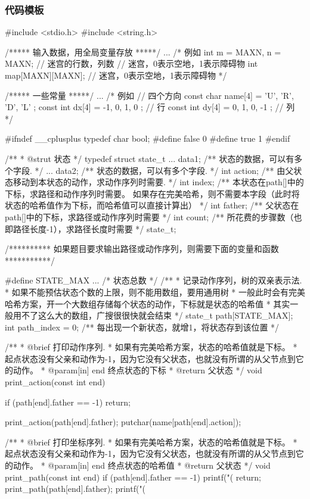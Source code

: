 \subsubsection{代码模板}
\begin{Codex}[label=bfs_template.c]
#include <stdio.h>
#include <string.h>

/***** 输入数据，用全局变量存放 *****/
...
/*
例如
int m = MAXN, n = MAXN;  // 迷宫的行数，列数
// 迷宫，0表示空地，1表示障碍物
int map[MAXN][MAXN];  // 迷宫，0表示空地，1表示障碍物
 */

/***** 一些常量 *****/
...
/* 例如
// 四个方向
const char name[4] = { 'U', 'R', 'D', 'L' };
const int dx[4] = { -1, 0, 1, 0 }; // 行
const int dy[4] = { 0, 1, 0, -1 }; // 列
*/

#ifndef __cplusplus
typedef char bool;
#define false 0
#define true 1
#endif

/**
 * @strut 状态
 */
typedef struct state_t {
    ... data1;  /** 状态的数据，可以有多个字段. */
    ... data2;  /** 状态的数据，可以有多个字段. */
    int action; /** 由父状态移动到本状态的动作，求动作序列时需要. */
    int index;  /** 本状态在path[]中的下标，求路径和动作序列时需要。
                    如果存在完美哈希，则不需要本字段（此时将
                   状态的哈希值作为下标，而哈希值可以直接计算出） */
    int father; /** 父状态在path[]中的下标，求路径或动作序列时需要 */
    int count;  /** 所花费的步骤数（也即路径长度-1），求路径长度时需要 */
} state_t;

/********** 如果题目要求输出路径或动作序列，则需要下面的变量和函数 ***********/

#define STATE_MAX ...  /* 状态总数 */
/**
 * 记录动作序列，树的双亲表示法.
 * 如果不能预估状态个数的上限，则不能用数组，要用通用树
 * 一般此时会有完美哈希方案，开一个大数组存储每个状态的动作，下标就是状态的哈希值
 * 其实一般用不了这么大的数组，广搜很很快就会结束
 */
state_t path[STATE_MAX];
int path_index = 0;  /** 每出现一个新状态，就增1，将状态存到该位置 */

/**
 * @brief 打印动作序列.
 * 如果有完美哈希方案，状态的哈希值就是下标。
 * 起点状态没有父亲和动作为-1，因为它没有父状态，也就没有所谓的从父节点到它的动作。
 * @param[in] end 终点状态的下标
 * @return 父状态
 */
void print_action(const int end) {
    if (path[end].father == -1) return;

    print_action(path[end].father);
    putchar(name[path[end].action]);
}

/**
 * @brief 打印坐标序列.
 * 如果有完美哈希方案，状态的哈希值就是下标。
 * 起点状态没有父亲和动作为-1，因为它没有父状态，也就没有所谓的从父节点到它的动作。
 * @param[in] end 终点状态的哈希值
 * @return 父状态
 */
void print_path(const int end) {
    if (path[end].father == -1) {
        printf("(%
        return;
    }
    print_path(path[end].father);
    printf("(%
}


\end{Codex}
